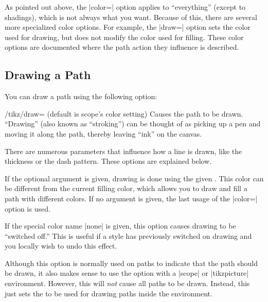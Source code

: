 As pointed out above, the |color=| option applies to ``everything''
(except to shadings), which is not always what you want. Because of
this, there are several more specialized color options. For example,
the |draw=| option sets the color used for drawing, but does not
modify the color used for filling. These color options are documented
where the path action they influence is described.


\subsection{Drawing a Path}

You can draw a path using the following option:
\begin{key}{/tikz/draw= (default \normalfont is scope's color setting)}
  Causes the path to be drawn. ``Drawing'' (also known as
  ``stroking'') can be thought of as picking up a pen and moving it
  along the path, thereby leaving ``ink'' on the canvas.

  There are numerous parameters that influence how a line is drawn,
  like the thickness or the dash pattern. These options are explained
  below.

  If the optional  argument is given, drawing is done
  using the given . This color can be different from the
  current filling color, which allows you to draw and fill a path with
  different colors. If no  argument is given, the last
  usage of the |color=| option is used.

  If the special color name |none| is given, this option causes
  drawing to be ``switched off.'' This is useful if a style has
  previously switched on drawing and you locally wish to undo this
  effect.

  Although this option is normally used on paths to indicate that the
  path should be drawn, it also makes sense to use the option with a
  |{scope}| or |{tikzpicture}| environment. However, this will
  \emph{not} cause all paths to be drawn. Instead, this just sets the
   to be used for drawing paths inside the environment.

\begin{codeexample}[]
\end{codeexample}
\end{key}


